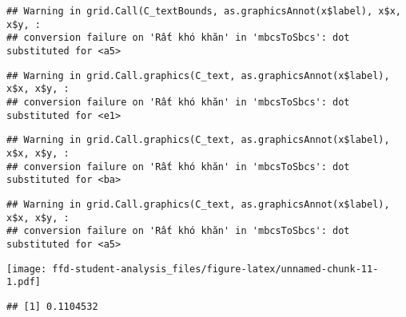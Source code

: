\documentclass[
]{article}
\newenvironment{Shaded}{\begin{snugshade}}{\end{snugshade}}
\newcommand{\AttributeTok}[1]{\textcolor[rgb]{0.13,0.29,0.53}{#1}}
\newcommand{\FunctionTok}[1]{\textcolor[rgb]{0.13,0.29,0.53}{\textbf{#1}}}
\newcommand{\NormalTok}[1]{#1}
\newcommand{\SpecialCharTok}[1]{\textcolor[rgb]{0.81,0.36,0.00}{\textbf{#1}}}
\newcommand{\StringTok}[1]{\textcolor[rgb]{0.31,0.60,0.02}{#1}}
\begin{document}
\begin{verbatim}
## Warning in grid.Call(C_textBounds, as.graphicsAnnot(x$label), x$x, x$y, :
## conversion failure on 'Rất khó khăn' in 'mbcsToSbcs': dot substituted for <a5>
\end{verbatim}

\begin{verbatim}
## Warning in grid.Call.graphics(C_text, as.graphicsAnnot(x$label), x$x, x$y, :
## conversion failure on 'Rất khó khăn' in 'mbcsToSbcs': dot substituted for <e1>
\end{verbatim}

\begin{verbatim}
## Warning in grid.Call.graphics(C_text, as.graphicsAnnot(x$label), x$x, x$y, :
## conversion failure on 'Rất khó khăn' in 'mbcsToSbcs': dot substituted for <ba>
\end{verbatim}

\begin{verbatim}
## Warning in grid.Call.graphics(C_text, as.graphicsAnnot(x$label), x$x, x$y, :
## conversion failure on 'Rất khó khăn' in 'mbcsToSbcs': dot substituted for <a5>
\end{verbatim}

\texttt{[image: ffd-student-analysis\_files/figure-latex/unnamed-chunk-11-1.pdf]}

\begin{Shaded}
\end{Shaded}

\begin{verbatim}
## [1] 0.1104532
\end{verbatim}
\end{document}
